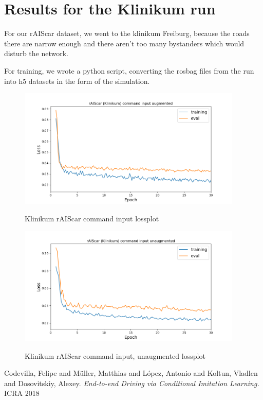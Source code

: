 \documentclass[a4paper]{article}
\begin{document}
\newpage{}
\section{Results for the Klinikum run}
For our rAIScar dataset, we went to the klinikum Freiburg, because the roads
there are narrow enough and there aren't too many bystanders which would disturb
the network.

For training, we wrote a python script, converting the rosbag files from the run
into h5 datasets in the form of the simulation.
\begin{figure}[!htbp]
  \centering
  \includegraphics[width=0.95\textwidth]{figures/klinikum_command_input_aug_lossplot}
  \label{fig:klinikum_augmented_command_loss}
  \caption{Klinikum rAIScar command input lossplot}
\end{figure}
\begin{figure}[!htbp]
  \centering
  \includegraphics[width=0.95\textwidth]{figures/klinikum_command_input_nonaug_lossplot}
  \label{fig:klinikum_unaugmented_command_loss}
  \caption{Klinikum rAIScar command input, unaugmented lossplot}
\end{figure}
\begin{thebibliography}{9}
Codevilla, Felipe and Müller, Matthias and López, Antonio and Koltun, Vladlen
and Dosovitskiy, Alexey.
\textit{End-to-end Driving via Conditional Imitation Learning.}
ICRA 2018
\end{thebibliography}
\end{document}
